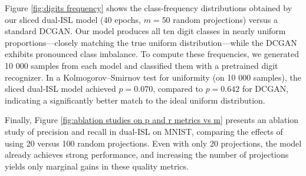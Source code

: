 \documentclass{article}
\begin{document}

    

Figure \ref{fig:digits frequency} shows the class‐frequency distributions obtained by our sliced dual‐ISL model (40 epochs, $m=50$ random projections) versus a standard DCGAN. Our model produces all ten digit classes in nearly uniform proportions—closely matching the true uniform distribution—while the DCGAN exhibits pronounced class imbalance. To compute these frequencies, we generated 10 000 samples from each model and classified them with a pretrained digit recognizer. In a Kolmogorov–Smirnov test for uniformity (on 10 000 samples), the sliced dual‐ISL model achieved $p = 0.070 $, compared to $p = 0.642$ for DCGAN, indicating a significantly better match to the ideal uniform distribution.

Finally, Figure \ref{fig:ablation studies on p and r metrics vs m} presents an ablation study of precision and recall in dual-ISL on MNIST, comparing the effects of using 20 versus 100 random projections. Even with only 20 projections, the model already achieves strong performance, and increasing the number of projections yields only marginal gains in these quality metrics.
\end{document}
